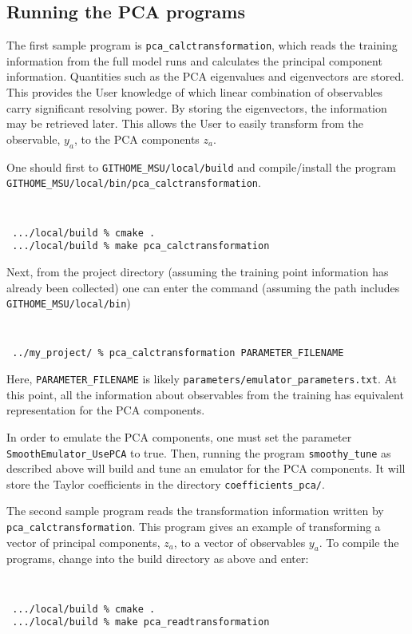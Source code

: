 \documentclass[main.tex]{subfiles}
\begin{document}
\subsection{Running the PCA programs}

The first sample program is {\tt pca\_calctransformation}, which reads the training information from the full model runs and calculates the principal component information. Quantities such as the PCA eigenvalues and eigenvectors are stored. This provides the User knowledge of which linear combination of observables carry significant resolving power. By storing the eigenvectors, the information may be retrieved later. This allows the User to easily transform from the observable, $y_a$, to the PCA components $z_a$. 

One should first to {\tt GITHOME\_MSU/local/build} and compile/install the program\\
{\tt GITHOME\_MSU/local/bin/pca\_calctransformation}.
{\tt
\begin{verbatim}
 .../local/build % cmake .
 .../local/build % make pca_calctransformation
 \end{verbatim}
}
Next, from the project directory (assuming the training point information has already been collected) one can enter the command (assuming the path includes {\tt GITHOME\_MSU/local/bin})
{\tt
\begin{verbatim}
 ../my_project/ % pca_calctransformation PARAMETER_FILENAME
 \end{verbatim}
}
Here, {\tt PARAMETER\_FILENAME} is likely {\tt parameters/emulator\_parameters.txt}. At this point, all the information about observables from the training has equivalent representation for the PCA components.

In order to emulate the PCA components, one must set the parameter {\tt SmoothEmulator\_UsePCA} to true. Then, running the program {\tt smoothy\_tune} as described above will build and tune an emulator for the PCA components. It will store the Taylor coefficients in the directory {\tt coefficients\_pca/}.

The second sample program reads the transformation information written by {\tt pca\_calctransformation}. This program gives an example of transforming a vector of principal components, $z_a$, to a vector of observables $y_a$. To compile the programs, change into the build directory as above and enter:
{\tt
\begin{verbatim}
 .../local/build % cmake .
 .../local/build % make pca_readtransformation
 \end{verbatim}
}
\end{document}
